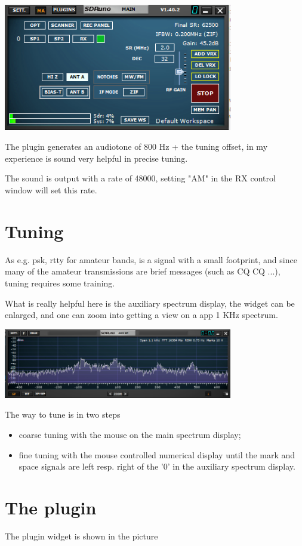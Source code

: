 \documentclass[11pt]{article}
\begin{document}
\includegraphics[width=100mm]{main-widget.png}

The plugin generates an audiotone of 800 Hz + the tuning offset, in my
experience is sound very helpful in precise tuning.

The sound is output with a rate of 48000, setting "AM" in the RX control window
will set this rate.

\section{Tuning}
As e.g. psk, rtty for amateur bands, is a signal with a small footprint,
and since many of the amateur transmissions are brief messages
(such as CQ CQ ...), tuning requires some training.
\par
What is really helpful here  is the auxiliary spectrum display, the widget
can be enlarged, and one can zoom into getting a
view on a app 1 KHz spectrum.

\includegraphics[width=100mm]{auxiliary-spectrum-display.png}

The way to tune is in two steps
\begin{itemize}
\item coarse tuning with the mouse on the main spectrum display;
\item fine tuning with the mouse controlled numerical display until the
mark and space signals  are left resp. right of the '0' in the auxiliary spectrum display.
\end{itemize}

\section{The plugin}
The plugin widget  is shown in the picture
\end{document}
